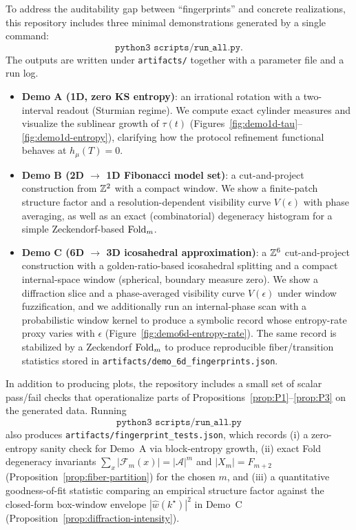 To address the auditability gap between ``fingerprints'' and concrete realizations, this repository includes three minimal demonstrations generated by a single command:
\[
\texttt{python3 scripts/run\_all.py}.
\]
The outputs are written under \texttt{artifacts/} together with a parameter file and a run log.
\begin{itemize}[leftmargin=*,itemsep=2pt]
  \item \textbf{Demo A (1D, zero KS entropy)}: an irrational rotation with a two-interval readout (Sturmian regime). We compute exact cylinder measures and visualize the sublinear growth of $\tau(t)$ (Figures~\ref{fig:demo1d-tau}--\ref{fig:demo1d-entropy}), clarifying how the protocol refinement functional behaves at $h_\mu(T)=0$.
  \item \textbf{Demo B (2D $\rightarrow$ 1D Fibonacci model set)}: a cut-and-project construction from $\mathbb{Z}^2$ with a compact window. We show a finite-patch structure factor and a resolution-dependent visibility curve $V(\epsilon)$ with phase averaging, as well as an exact (combinatorial) degeneracy histogram for a simple Zeckendorf-based $\mathrm{Fold}_m$.
  \item \textbf{Demo C (6D $\rightarrow$ 3D icosahedral approximation)}: a $\mathbb{Z}^6$ cut-and-project construction with a golden-ratio-based icosahedral splitting and a compact internal-space window (spherical, boundary measure zero). We show a diffraction slice and a phase-averaged visibility curve $V(\epsilon)$ under window fuzzification, and we additionally run an internal-phase scan with a probabilistic window kernel to produce a symbolic record whose entropy-rate proxy varies with $\epsilon$ (Figure~\ref{fig:demo6d-entropy-rate}). The same record is stabilized by a Zeckendorf $\mathrm{Fold}_m$ to produce reproducible fiber/transition statistics stored in \texttt{artifacts/demo\_6d\_fingerprints.json}.
\end{itemize}

\begin{remark}\label{rem:fingerprint-tests}
In addition to producing plots, the repository includes a small set of scalar pass/fail checks that operationalize parts of Propositions~\ref{prop:P1}--\ref{prop:P3} on the generated data. Running
\[
\texttt{python3 scripts/run\_all.py}
\]
also produces \texttt{artifacts/fingerprint\_tests.json}, which records (i) a zero-entropy sanity check for Demo~A via block-entropy growth, (ii) exact Fold degeneracy invariants $\sum_x|\mathcal{F}_m(x)|=|\mathcal{A}|^m$ and $|X_m|=F_{m+2}$ (Proposition~\ref{prop:fiber-partition}) for the chosen $m$, and (iii) a quantitative goodness-of-fit statistic comparing an empirical structure factor against the closed-form box-window envelope $|\widehat w(k^\star)|^2$ in Demo~C (Proposition~\ref{prop:diffraction-intensity}).
\end{remark}

